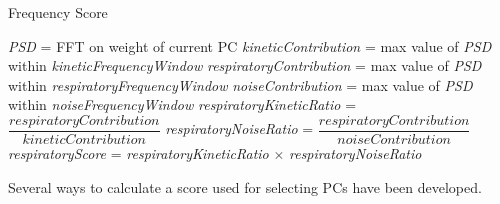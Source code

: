                     \begin{algorithm}
                        \caption{Frequency Score}
                        \;
                        \textit{PSD} = \gls{FFT} on weight of current \gls{PC}\;
                        \;
                        \textit{kineticContribution} = max value of \textit{PSD} within \textit{kineticFrequencyWindow}\;
                        \textit{respiratoryContribution} = max value of \textit{PSD}  within \textit{respiratoryFrequencyWindow}\;
                        \textit{noiseContribution} = max value of \textit{PSD} within \textit{noiseFrequencyWindow}\;
                        \;
                        \textit{respiratoryKineticRatio} = $\dfrac{\textit{respiratoryContribution}}{\textit{kineticContribution}}$\;
                        \;
                        \textit{respiratoryNoiseRatio} = $\dfrac{\textit{respiratoryContribution}}{\textit{noiseContribution}}$\;
                        \;
                        \textit{respiratoryScore} = \textit{respiratoryKineticRatio} $\times$ \textit{respiratoryNoiseRatio}\;
                        \;
        
                        \label{alg:pca_data_driven_surrogate_signal_extraction_methods_for_dynamic_pet_methods_score_select_and_combine_method_score_and_select_frequency_score_pseudo_code}
                    \end{algorithm}
                
                    Several ways to calculate a score used for selecting \glspl{PC} have been developed.
                    
